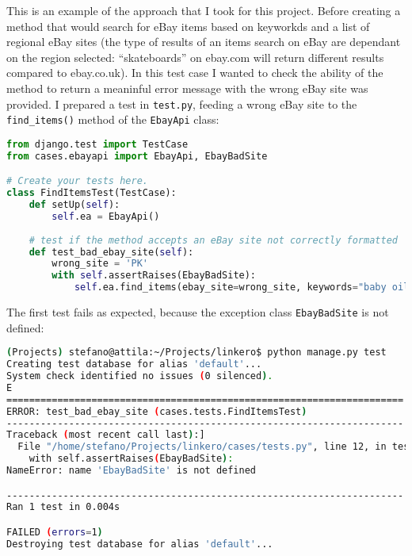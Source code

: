 This is an example of the approach that I took for this project. Before
creating a method that would search for eBay items based on keyworkds and
a list of regional eBay sites (the type of results of an items search on eBay
are dependant on the region selected: ``skateboards'' on ebay.com will return
different results compared to ebay.co.uk). In this test case I wanted to check
the ability of the method to return a meaninful error message with the wrong
eBay site was provided. I prepared a test in \texttt{test.py}, feeding a wrong
eBay site to the \texttt{find\_items()} method of the \texttt{EbayApi} class:
\begin{lstlisting}[language=Python, breaklines=true]
from django.test import TestCase
from cases.ebayapi import EbayApi, EbayBadSite

# Create your tests here.
class FindItemsTest(TestCase):
    def setUp(self):
        self.ea = EbayApi()
    
    # test if the method accepts an eBay site not correctly formatted
    def test_bad_ebay_site(self):
        wrong_site = 'PK'
        with self.assertRaises(EbayBadSite):
            self.ea.find_items(ebay_site=wrong_site, keywords="baby oil")
\end{lstlisting}

The first test fails as expected, because the exception class
\texttt{EbayBadSite} is not defined:
\begin{lstlisting}[language=bash, breaklines=true]
(Projects) stefano@attila:~/Projects/linkero$ python manage.py test
Creating test database for alias 'default'...
System check identified no issues (0 silenced).
E
======================================================================
ERROR: test_bad_ebay_site (cases.tests.FindItemsTest)
----------------------------------------------------------------------
Traceback (most recent call last):]
  File "/home/stefano/Projects/linkero/cases/tests.py", line 12, in test_bad_ebay_site
    with self.assertRaises(EbayBadSite):
NameError: name 'EbayBadSite' is not defined

----------------------------------------------------------------------
Ran 1 test in 0.004s

FAILED (errors=1)
Destroying test database for alias 'default'...
\end{lstlisting}

